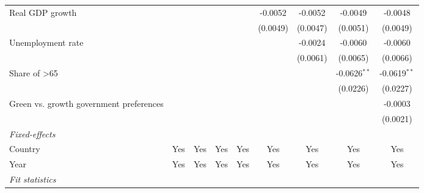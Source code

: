 \begin{table}[htbp]
\begin{tabular}{lcccccccc}
      Real GDP growth                                                         &          &          &                 &                 & -0.0052         & -0.0052         & -0.0049         & -0.0048\\   
                                                                              &          &          &                 &                 & (0.0049)        & (0.0047)        & (0.0051)        & (0.0049)\\   
      Unemployment rate                                                       &          &          &                 &                 &                 & -0.0024         & -0.0060         & -0.0060\\   
                                                                              &          &          &                 &                 &                 & (0.0061)        & (0.0065)        & (0.0066)\\   
      Share of >65                                                            &          &          &                 &                 &                 &                 & -0.0626$^{**}$  & -0.0619$^{**}$\\   
                                                                              &          &          &                 &                 &                 &                 & (0.0226)        & (0.0227)\\   
      Green vs. growth government preferences                                 &          &          &                 &                 &                 &                 &                 & -0.0003\\   
                                                                              &          &          &                 &                 &                 &                 &                 & (0.0021)\\   
      \midrule
      \emph{Fixed-effects}\\
      Country                                                                 & Yes      & Yes      & Yes             & Yes             & Yes             & Yes             & Yes             & Yes\\  
      Year                                                                    & Yes      & Yes      & Yes             & Yes             & Yes             & Yes             & Yes             & Yes\\  
      \midrule
      \emph{Fit statistics}\\

\end{tabular}
\end{table}
